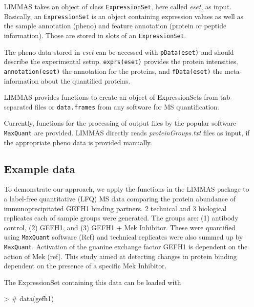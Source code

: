 \documentclass[a4paper,11pt]{article}
\newcommand{\Robject}[1]{{\texttt{#1}}}
\newcommand{\Rfunction}[1]{{\texttt{#1}}}
\begin{document}
LIMMAS takes an object of class \Robject{ExpressionSet}, here called \emph{eset}, as input. Basically, an \Robject{ExpressionSet} is an object containing expression values as well as the sample annotation (pheno) and feature annotation (protein or peptide information). Those are stored in slots of an \Robject{ExpressionSet}.

The pheno data stored in \emph{eset} can be accessed with \Rfunction{pData(eset)} and should describe the experimental setup. \Rfunction{exprs(eset)} provides the protein intensities, \Rfunction{annotation(eset)} the annotation for the proteins, and \Rfunction{fData(eset)} the meta-information about the quantified proteins.

LIMMAS provides functions to create an object of ExpressionSets from tab-separated files or \Robject{data.frames} from any software for MS quantification. 

Currently, functions for the processing of output files by the popular software \texttt{MaxQuant} are provided. LIMMAS directly reads \emph{proteinGroups.txt} files as input, if the appropriate pheno data is provided manually.

\subsection{Example data}
 
To demonstrate our approach, we apply the functions in the LIMMAS package to a label-free quantitative (LFQ) MS data
comparing the protein abundance of immunoprecipitated GEFH1 binding partners. 2 technical and 3 biological 
replicates each of sample groups were generated. The groups are: (1) antibody control, (2) GEFH1, and (3) GEFH1 + Mek 
Inhibitor. These were quantified using \texttt{MaxQuant} software (Ref) and technical replicates were also summed up by 
\texttt{MaxQuant}. Activation of the guanine exchange factor GEFH1 is dependent on the action of Mek (ref). This study aimed at detecting changes in protein binding dependent on the presence of a specific Mek Inhibitor.

The ExpressionSet containing this data can be loaded with
\begin{Schunk}
\begin{Sinput}
> # data(gefh1)
\end{Sinput}
\end{Schunk}
\end{document}
